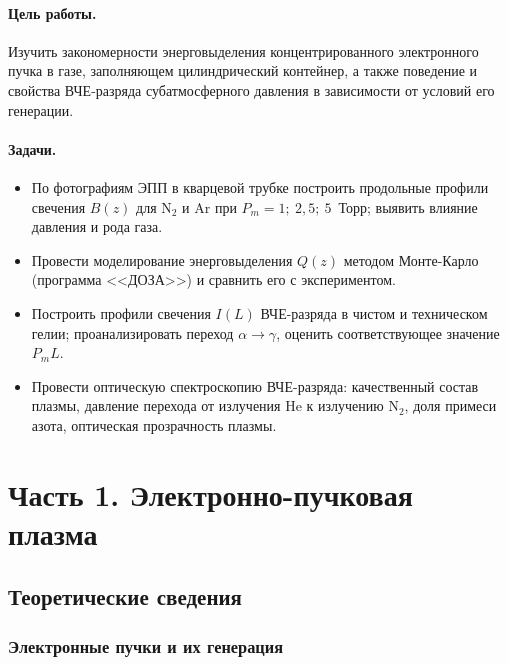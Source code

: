 \documentclass[12pt,a4paper]{article}
\newcommand{\Nt}{\mathrm{N_2}}
\begin{document}
\paragraph{Цель работы.}
Изучить закономерности энерговыделения концентрированного электронного
пучка в газе, заполняющем цилиндрический контейнер, а также поведение и
свойства ВЧЕ-разряда субатмосферного давления в зависимости от условий
его генерации.

\paragraph{Задачи.}
\begin{itemize}
  \item По фотографиям ЭПП в кварцевой трубке построить продольные
        профили свечения $B(z)$ для $\Nt$ и Ar при
        $P_m = 1;\ 2{,}5;\ 5$~Торр; выявить влияние давления и рода газа.
  \item Провести моделирование энерговыделения $Q(z)$ методом Монте-Карло
        (программа <<ДОЗА>>) и сравнить его с экспериментом.
  \item Построить профили свечения $I(L)$ ВЧЕ-разряда в чистом и
        техническом гелии; проанализировать переход $\alpha \to \gamma$,
        оценить соответствующее значение $P_m L$.
  \item Провести оптическую спектроскопию ВЧЕ-разряда: качественный
        состав плазмы, давление перехода от излучения He к излучению
        $\Nt$, доля примеси азота, оптическая прозрачность плазмы.
\end{itemize}

\section{Часть 1. Электронно-пучковая плазма}

\subsection{Теоретические сведения}

\subsubsection{Электронные пучки и их генерация}
\end{document}

